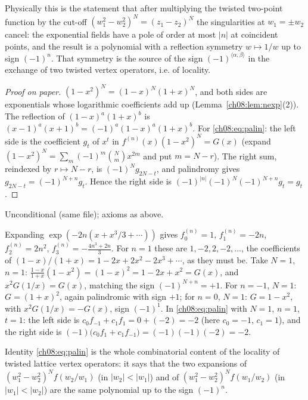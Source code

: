 \begin{physics}
Physically this is the statement that after multiplying the twisted two-point function by the cut-off $(w_1^2-w_2^2)^N=(z_1-z_2)^N$ the singularities at $w_1=\pm w_2$ cancel: the exponential fields have a pole of order at most $|n|$ at coincident points, and the result is a polynomial with a reflection symmetry $w\mapsto 1/w$ up to sign $(-1)^{n}$. That symmetry is the source of the sign $(-1)^{\langle\alpha,\beta\rangle}$ in the exchange of two twisted vertex operators, i.e. of locality.
\end{physics}
\begin{proof}[Proof on paper]
$(1-x^2)^N=(1-x)^N(1+x)^N$, and both sides are exponentials whose logarithmic coefficients add
up (Lemma~\ref{ch08:lem:nexp}(2)).  The reflection of $(1-x)^a(1+x)^b$ is $(x-1)^a(x+1)^b
=(-1)^a(1-x)^a(1+x)^b$.  For \eqref{ch08:eq:palin}: the left side is the coefficient $g_t$ of $x^t$
in $f^{(n)}(x)(1-x^2)^N=G(x)$ (expand $(1-x^2)^N=\sum_m(-1)^m\binom Nmx^{2m}$ and put $m=N-r$).  The
right sum, reindexed by $r\mapsto N-r$, is $(-1)^Ng_{2N-t}$, and palindromy gives
$g_{2N-t}=(-1)^{N+n}g_t$.  Hence the right side is $(-1)^{|n|}(-1)^N(-1)^{N+n}g_t=g_t$.
\end{proof}
\begin{status}
Unconditional (same file); axioms as above.
\end{status}
\begin{example}\label{ch08:ex:fco}
Expanding $\exp(-2n(x+x^3/3+\cdots))$ gives
$f^{(n)}_0=1$, $f^{(n)}_1=-2n$, $f^{(n)}_2=2n^2$, $f^{(n)}_3=-\frac{4n^3+2n}{3}$.  For $n=1$ these are
$1,-2,2,-2,\dots$, the coefficients of $(1-x)/(1+x)=1-2x+2x^2-2x^3+\cdots$, as they must be.  Take
$N=1$, $n=1$: $\frac{1-x}{1+x}(1-x^2)=(1-x)^2=1-2x+x^2=G(x)$, and $x^2G(1/x)=G(x)$, matching the sign
$(-1)^{N+n}=+1$.  For $n=-1$, $N=1$: $G=(1+x)^2$, again palindromic with sign $+1$; for $n=0$,
$N=1$: $G=1-x^2$, with $x^2G(1/x)=-G(x)$, sign $(-1)^{1}$.  In \eqref{ch08:eq:palin} with $N=1$,
$n=1$, $t=1$: the left side is $c_0f_{-1}+c_1f_1=0+(-2)=-2$ (here $c_0=-1$, $c_1=1$), and the right side
is $(-1)\bigl(c_0f_{1}+c_1f_{-1}\bigr)=(-1)(-1)(-2)=-2$.
\end{example}

Identity \eqref{ch08:eq:palin} is the whole combinatorial content of the locality of twisted
lattice vertex operators: it says that the two expansions of $(w_1^2-w_2^2)^N f(w_2/w_1)$ (in
$|w_2|<|w_1|$) and of $(w_1^2-w_2^2)^Nf(w_1/w_2)$ (in $|w_1|<|w_2|$) are the same polynomial up to
the sign $(-1)^n$.

